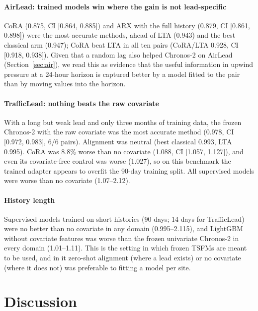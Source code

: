 \documentclass[preprint,11pt,authoryear]{elsarticle}
\newcommand{\lta}{\textsc{LTA}}
\begin{document}
\paragraph{AirLead: trained models win where the gain is not lead-specific} CoRA (0.875, CI [0.864, 0.885]) and ARX with the full history (0.879, CI [0.861, 0.898]) were the most accurate methods, ahead of \lta{} (0.943) and the best classical arm (0.947); CoRA beat \lta{} in all ten pairs (CoRA/\lta{} 0.928, CI [0.918, 0.938]). Given that a random lag also helped Chronos-2 on AirLead (Section~\ref{sec:air}), we read this as evidence that the useful information in upwind pressure at a 24-hour horizon is captured better by a model fitted to the pair than by moving values into the horizon.

\paragraph{TrafficLead: nothing beats the raw covariate} With a long but weak lead and only three months of training data, the frozen Chronos-2 with the raw covariate was the most accurate method (0.978, CI [0.972, 0.983], 6/6 pairs). Alignment was neutral (best classical 0.993, \lta{} 0.995). CoRA was 8.8\% worse than no covariate (1.088, CI [1.057, 1.127]), and even its covariate-free control was worse (1.027), so on this benchmark the trained adapter appears to overfit the 90-day training split. All supervised models were worse than no covariate (1.07--2.12).

\paragraph{History length} Supervised models trained on short histories (90 days; 14 days for TrafficLead) were no better than no covariate in any domain (0.995--2.115), and LightGBM without covariate features was worse than the frozen univariate Chronos-2 in every domain (1.01--1.11). This is the setting in which frozen TSFMs are meant to be used, and in it zero-shot alignment (where a lead exists) or no covariate (where it does not) was preferable to fitting a model per site.



\section{Discussion}
\label{sec:discussion}
\end{document}
